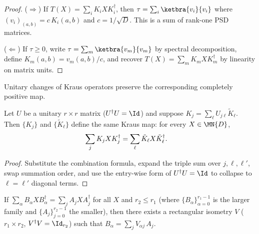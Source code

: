 \begin{proof}
    \leanok
    ($\Rightarrow$) If $T(X) = \sum_i K_i X K_i^\dagger$, then
    $\tau = \sum_i \ketbra{v_i}{v_i}$ where
    $(v_i)_{(a,b)} = c\,K_i(a,b)$ and $c = 1/\sqrt{D}$.
    This is a sum of rank-one PSD matrices.

    ($\Leftarrow$) If $\tau \ge 0$, write
    $\tau = \sum_m \ketbra{v_m}{v_m}$
    by spectral decomposition, define $K_m(a,b) = v_m(a,b)/c$,
    and recover $T(X) = \sum_m K_m X K_m^\dagger$ by linearity on
    matrix units.
\end{proof}

Unitary changes of Kraus operators preserve the corresponding completely
positive map.

\begin{theorem}\label{thm:kraus_same_map_of_unitary_combination}
    \leanok
    Let $U$ be a unitary $r \times r$ matrix ($U^\dagger U = \Id$)
    and suppose $K_j = \sum_\ell U_{j\ell} \tilde{K}_\ell$.
    Then $\{K_j\}$ and $\{\tilde{K}_\ell\}$ define the same Kraus map:
    for every $X \in \MN{D}$,
    \begin{align}
        \sum_j K_j X K_j^\dagger
        &= \sum_\ell \tilde{K}_\ell X \tilde{K}_\ell^\dagger.
        \notag
    \end{align}
\end{theorem}

\begin{proof}
    \leanok
    Substitute the combination formula, expand the triple sum over
    $j,\ell,\ell'$, swap summation order, and use the entry-wise form
    of $U^\dagger U = \Id$ to collapse to $\ell = \ell'$ diagonal terms.
\end{proof}

\begin{theorem}\label{thm:kraus_rectangular_freedom}
    \leanok
    If $\sum_\alpha B_\alpha X B_\alpha^\dagger = \sum_j A_j X A_j^\dagger$
    for all $X$ and $r_2 \le r_1$ (where $\{B_\alpha\}_{\alpha=0}^{r_1-1}$
    is the larger family and $\{A_j\}_{j=0}^{r_2-1}$ the smaller),
    then there exists a rectangular isometry
    $V$ ($r_1 \times r_2$, $V^\dagger V = \Id_{r_2}$) such that
    $B_\alpha = \sum_j V_{\alpha j}\,A_j$.
\end{theorem}


